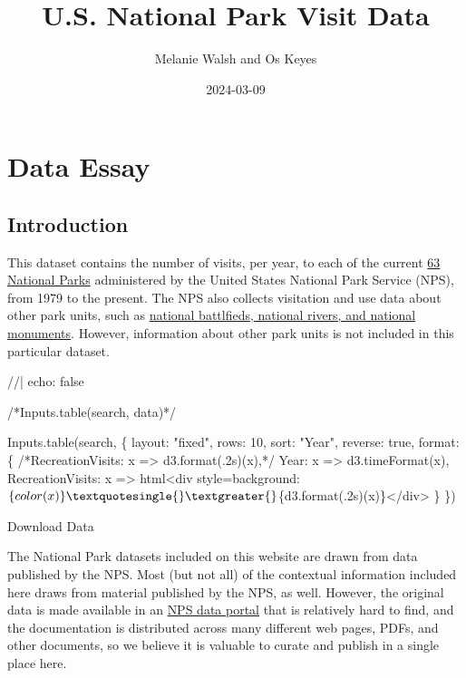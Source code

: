 \documentclass[
  letterpaper,
  DIV=11,
  numbers=noendperiod]{scrartcl}
\title{U.S. National Park Visit Data}
\author{Melanie Walsh and Os Keyes}
\date{2024-03-09}
\newenvironment{Shaded}{\begin{snugshade}}{\end{snugshade}}
\newcommand{\NormalTok}[1]{\textcolor[rgb]{0.00,0.23,0.31}{#1}}
\renewcommand*\contentsname{Table of contents}
\newcommand\contentsname{Table of contents}
\begin{document}
\maketitle

\renewcommand*\contentsname{Table of contents}
{
\hypersetup{linkcolor=}
\setcounter{tocdepth}{5}
\tableofcontents
}
\section{Data Essay}

\subsection{Introduction}\label{introduction}

This dataset contains the number of visits, per year, to each of the
current
\href{https://en.wikipedia.org/wiki/List_of_national_parks_of_the_United_States\#National_parks}{63
National Parks} administered by the United States National Park Service
(NPS), from 1979 to the present. The NPS also collects visitation and
use data about other park units, such as
\href{(https://www.nps.gov/aboutus/national-park-system.htm)}{national
battlfieds, national rivers, and national monuments}. However,
information about other park units is not included in this particular
dataset.

\begin{Shaded}
\begin{Highlighting}[]
\NormalTok{//| echo: false}

\NormalTok{/*Inputs.table(search, data)*/}

\NormalTok{Inputs.table(search, \{}
\NormalTok{  layout: "fixed",}
\NormalTok{  rows: 10,}
\NormalTok{  sort: "Year",}
\NormalTok{  reverse: true,}
\NormalTok{  format: \{}
\NormalTok{    /*RecreationVisits: x =\textgreater{} d3.format(\textquotesingle{}.2s\textquotesingle{})(x),*/}
\NormalTok{    Year: x =\textgreater{} d3.timeFormat(x),}
\NormalTok{    RecreationVisits: x =\textgreater{} html\textasciigrave{}\textless{}div style=\textquotesingle{}background:$\{color(x)\}\textquotesingle{}\textgreater{}$\{d3.format(\textquotesingle{}.2s\textquotesingle{})(x)\}\textless{}/div\textgreater{}\textasciigrave{}}
\NormalTok{  \}}
\NormalTok{\})}
\end{Highlighting}
\end{Shaded}

Download Data

The National Park datasets included on this website are drawn from data
published by the NPS. Most (but not all) of the contextual information
included here draws from material published by the NPS, as well.
However, the original data is made available in an
\href{https://irma.nps.gov/Stats/}{NPS data portal} that is relatively
hard to find, and the documentation is distributed across many different
web pages, PDFs, and other documents, so we believe it is valuable to
curate and publish in a single place here.
\end{document}
